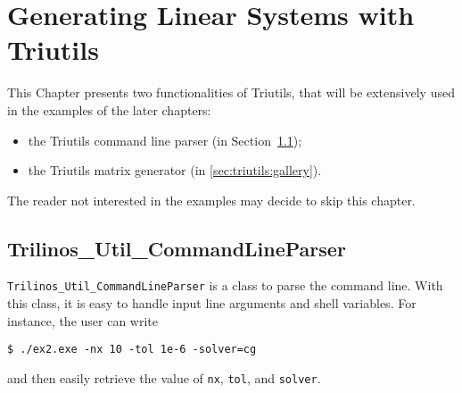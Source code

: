 % 
% 
% 
%  
%  
% 

\section{Generating Linear Systems with Triutils}
\label{chap:triutils}

This Chapter presents two functionalities of Triutils, that will be
extensively used in the examples of the later chapters: 
\begin{itemize}
\item the Triutils command line parser (in
  Section~\ref{sec:triutils:CLP});
\item the Triutils matrix generator (in \ref{sec:triutils:gallery}).
\end{itemize}
The reader not interested in the examples may decide to skip this chapter.


\subsection{Trilinos\_Util\_CommandLineParser}
\label{sec:triutils:CLP}

\verb!Trilinos_Util_CommandLineParser! is a class to parse the command
line.  With this class, it is easy to handle
input line arguments and shell variables. For instance, the user can
write
\begin{verbatim}
$ ./ex2.exe -nx 10 -tol 1e-6 -solver=cg
\end{verbatim}
and then easily retrieve the value of {\tt nx}, {\tt tol}, and {\tt solver}.
 
